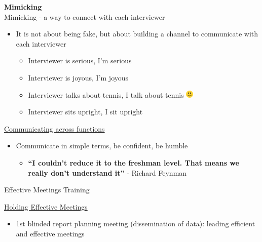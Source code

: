 \documentclass{beamer}
\begin{document}
\begin{frame}
	\center
	\textbf{Mimicking}\\
	\pause
	Mimicking - a way to connect with each interviewer
	\pause
	\begin{itemize}
	\item \alert{It is not about being fake, but about building a channel to
		communicate with each interviewer}
		\pause
			\begin{itemize}
			\item Interviewer is serious, I’m serious
			\pause
			\item Interviewer is joyous, I’m joyous
			\pause
			\item Interviewer talks about tennis, I talk about tennis \includegraphics[height=1em]{smiley-icon.png}
			\pause
			\item Interviewer sits upright, I sit upright	
			\end{itemize}
	\end{itemize}
\end{frame}

\begin{frame}
	\center
	\underline{Communicating across functions}\\
	\vspace{15pt} 
	\begin{itemize}
		\item Communicate in simple terms, be confident, be humble
		\begin{itemize}	
		\item \textbf {“I couldn’t reduce it to the freshman level. That means
		we really don’t understand it”} - Richard Feynman
		\end{itemize}
	\end{itemize}
\end{frame}

\begin{frame}
	\center
	Effective Meetings Training
\end{frame}

\begin{frame}
	\center
	\underline{Holding Effective Meetings}\\
	\vspace{15pt} 
	\begin{itemize}
		\item 1st blinded report planning meeting (dissemination of data):
		leading efficient and effective meetings
	\end{itemize}
\end{frame}	
\end{document}
